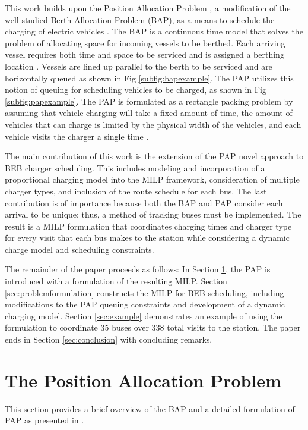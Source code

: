 \documentclass[utf8]{FrontiersinHarvard}
\let\cite\citep                                                                 %
\newcommand{\A}{35 }                                                            %
\newcommand{\N}{338 }                                                           %
\begin{document}
This work builds upon the Position Allocation Problem \cite{Qarebagh2019}, a modification of the well studied Berth Allocation Problem
(BAP), as a means to schedule the charging of electric vehicles \cite{Buhrkal2010, Frojan2015, Imai2001}.
The BAP is a continuous time model that solves the problem of allocating space for incoming vessels to be berthed. Each
arriving vessel requires both time and space to be serviced and is assigned a berthing location \cite{Imai2001}. Vessels
are lined up parallel to the berth to be serviced and are horizontally queued as shown in Fig \ref{subfig:bapexample}.
The PAP utilizes this notion of queuing for scheduling vehicles to be charged, as shown in Fig \ref{subfig:papexample}.
The PAP is formulated as a rectangle packing problem by assuming that vehicle charging will take a fixed amount of time,
the amount of vehicles that can charge is limited by the physical width of the vehicles, and each vehicle visits the
charger a single time \cite{Qarebagh2019}.

The main contribution of this work is the extension of the PAP novel approach to BEB charger scheduling. This includes
modeling and incorporation of a proportional charging model into the MILP framework, consideration of multiple charger
types, and inclusion of the route schedule for each bus. The last contribution is of importance because both the BAP and PAP
consider each arrival to be unique; thus, a method of tracking buses must be implemented.
The result is a MILP formulation that coordinates charging times and charger type for every visit that each bus makes to the station while considering a dynamic charge model and
scheduling constraints.

The remainder of the paper proceeds as follows: In Section \ref{sec:positionallocationproblem}, the PAP is introduced
with a formulation of the resulting MILP. Section \ref{sec:problemformulation} constructs the MILP for BEB scheduling,
including modifications to the PAP queuing constraints and development of a dynamic charging model. Section
\ref{sec:example} demonstrates an example of using the formulation to coordinate \A buses over \N total visits to the
  station. The paper ends in Section \ref{sec:conclusion} with concluding remarks.

\section{The Position Allocation Problem}
\label{sec:positionallocationproblem}
This section provides a brief overview of the BAP and a detailed formulation of PAP as presented in \cite{Qarebagh2019}.
\end{document}
